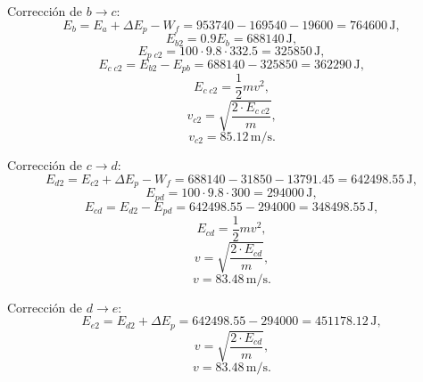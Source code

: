 \documentclass[a4paper,12pt]{article} %
\begin{document}
Corrección de $b \to c$:
\[
E_b = E_a + \Delta E_p - W_f = 953740 - 169540 - 19600 = 764600\,\mathrm{J},
\]
\[
E_{b2} = 0.9 E_b = 688140\,\mathrm{J},
\]
\[
E_{p \; c2} = 100 \cdot 9.8 \cdot 332.5 = 325850\,\mathrm{J},
\]
\[
E_{c \; c2} = E_{b2} - E_{pb} = 688140 - 325850 = 362290\,\mathrm{J},
\]
\[
E_{c \; c2} = \frac{1}{2} m v^2,
\]
\[
v_{c2} = \sqrt{\frac{2 \cdot E_{c \; c2}}{m}},
\]
\[
v_{c2} = 85.12\,\mathrm{m/s}.
\]

Corrección de $c \to d$:
\[
E_{d2} = E_{c2} + \Delta E_p - W_f = 688140 - 31850 - 13791.45 = 642498.55\,\mathrm{J},
\]
\[
E_{pd} = 100 \cdot 9.8 \cdot 300 = 294000\,\mathrm{J},
\]
\[
E_{cd} = E_{d2} - E_{pd} = 642498.55 - 294000 = 348498.55\,\mathrm{J},
\]
\[
E_{cd} = \frac{1}{2} m v^2,
\]
\[
v = \sqrt{ \frac{2 \cdot E_{cd}}{m}},
\]
\[
v = 83.48\,\mathrm{m/s}.
\]

Corrección de $d \to e$:
\[
E_{e2} = E_{d2} + \Delta E_p = 642498.55 - 294000 = 451178.12\,\mathrm{J},
\]
\[
v = \sqrt{\frac{2 \cdot E_{cd}}{m}},
\]
\[
v = 83.48\,\mathrm{m/s}.
\]
\end{document}
